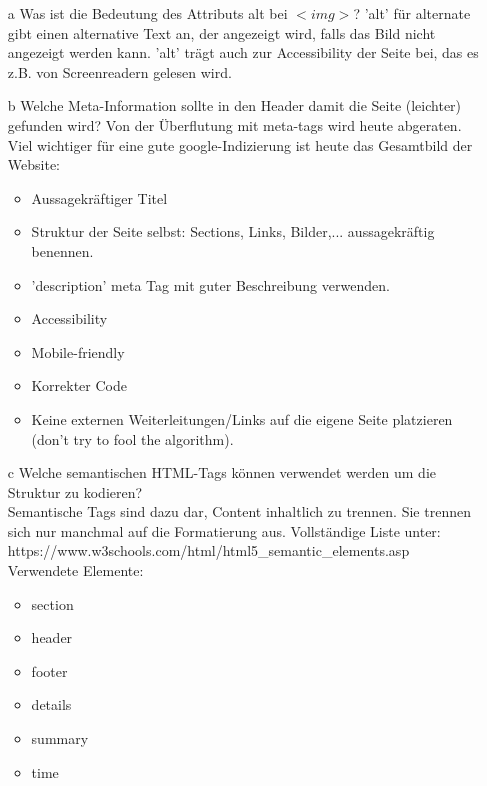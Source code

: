 \documentclass[12pt, a4paper]{report}
\begin{document}
\begin{itemize}
  \item[a] Was ist die Bedeutung des Attributs alt bei $<img>$?
  'alt' für alternate gibt einen alternative Text an, der angezeigt wird, falls das Bild nicht
  angezeigt werden kann. 'alt' trägt auch zur Accessibility der Seite bei, das es z.B. von Screenreadern
  gelesen wird.
  \item[b] Welche Meta-Information sollte in den Header damit die Seite (leichter) gefunden wird?
  Von der Überflutung mit meta-tags wird heute abgeraten. Viel wichtiger für eine gute google-Indizierung ist
  heute das Gesamtbild der Website:
  \begin{itemize}
  	\item Aussagekräftiger Titel
  	\item Struktur der Seite selbst: Sections, Links, Bilder,... aussagekräftig benennen.
  	\item 'description' meta Tag mit guter Beschreibung verwenden.
  	\item Accessibility
  	\item Mobile-friendly
  	\item Korrekter Code
  	\item Keine externen Weiterleitungen/Links auf die eigene Seite platzieren (don't try to fool the algorithm).
  \end{itemize}
  \item[c] Welche semantischen HTML-Tags können verwendet werden um die Struktur zu kodieren?\\
  Semantische Tags sind dazu dar, Content inhaltlich zu trennen. Sie trennen sich nur manchmal auf die 
  Formatierung aus.
  Vollständige Liste unter:\\
  https://www.w3schools.com/html/html5\_semantic\_elements.asp\\
  Verwendete Elemente:\\
  \begin{itemize}
  	\item section
  	\item header
  	\item footer
  	\item details
  	\item summary
  	\item time
  \end{itemize}  
\end{itemize}
\end{document}
